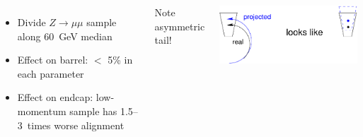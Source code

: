 \documentclass[compress]{beamer}
\begin{document}
\begin{frame}
\begin{columns}

\vspace{1 cm}
\begin{itemize}
\item Divide $Z\to\mu\mu$ sample along 60~GeV median
\item Effect on barrel: $<$ 5\% in each parameter
\item Effect on endcap: low-momentum sample has 1.5--3~times worse alignment
\end{itemize}

\vspace{0.2 cm}
Note asymmetric tail!

\vspace{-0.4 cm}
\begin{center}
\includegraphics[width=0.8\linewidth]{momentum_y_explanation.pdf}
\end{center}
\end{columns}
\end{frame}
\end{document}
